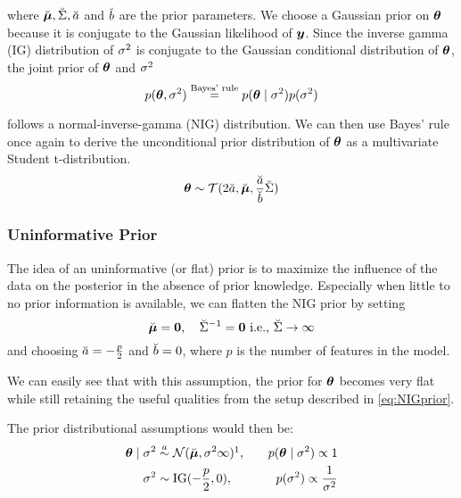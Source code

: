 where $\breve{\bm{\mu}}, \breve{\Sigma}, \breve{a}$ and $\breve{b}$ are the prior parameters.
We choose a Gaussian prior on $\bm{\theta}$ because it is conjugate to the Gaussian likelihood of $\bm{y}$.
Since the inverse gamma (IG) distribution of $\sigma^2$ is conjugate to the Gaussian conditional distribution of $\bm{\theta}$, the joint prior of $\bm{\theta}$ and $\sigma^2$
\begin{equation*}
    p(\bm{\theta}, \sigma^2) \overset{\text{Bayes' rule}}{=} p(\bm{\theta} \mid \sigma^2) p(\sigma^2)
\end{equation*}

follows a normal-inverse-gamma (NIG) distribution.
We can then use Bayes' rule once again to derive the unconditional prior distribution of $\bm{\theta}$ as a multivariate Student t-distribution.
\begin{equation*}
    \bm{\theta} \sim \mathcal{T}(2 \breve{a}, \breve{\bm{\mu}}, \frac{\breve{a}}{\breve{b}} \breve{\Sigma})
\end{equation*}

\subsubsection*{Uninformative Prior}
The idea of an uninformative (or flat) prior is to maximize the influence of the data on the posterior in the absence of prior knowledge.
Especially when little to no prior information is available, we can flatten the NIG prior by setting
\begin{equation*}
    \breve{\bm{\mu}} = \bm{0}, \quad \breve{\Sigma}^{-1} = \bm{0} \text{  i.e., } \breve{\Sigma} \to \infty 
\end{equation*}
and choosing $\breve{a} = - \frac{p}{2}$ and $\breve{b} = 0$, where $p$ is the number of features in the model.

We can easily see that with this assumption, the prior for $\bm{\theta}$ becomes very flat while still retaining the useful qualities from the setup described in \autoref{eq:NIGprior}.

The prior distributional assumptions would then be:
\begin{equation} \label{eq:flat-prior}
    \begin{aligned}
        \btheta \mid \ssd &\overset{a}{\sim}  \Ncal(\mupri, \ssd \infty)\footnotemark, \quad &p(\btheta\mid \ssd) \propto 1\\
        \ssd &\sim \IG(-\frac{p}{2},  0), \quad &p(\ssd) \propto \frac{1}{\ssd}
    \end{aligned}
\end{equation}


